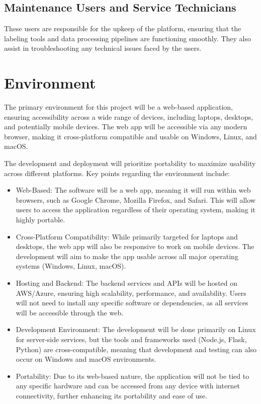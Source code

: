 \documentclass{article}
\begin{document}
\subsection{Maintenance Users and Service Technicians}
These users are responsible for the upkeep of the platform, ensuring that the labeling tools and data processing pipelines are functioning smoothly. They also assist in troubleshooting any technical issues faced by the users.

\newpage


\section{Environment}

The primary environment for this project will be a web-based application, ensuring accessibility across a wide range of devices, including laptops, desktops, and potentially mobile devices. The web app will be accessible via any modern browser, making it cross-platform compatible and usable on Windows, Linux, and macOS.

The development and deployment will prioritize portability to maximize usability across different platforms. Key points regarding the environment include:

\begin{itemize}
    \item Web-Based: The software will be a web app, meaning it will run within web browsers, such as Google Chrome, Mozilla Firefox, and Safari. This will allow users to access the application regardless of their operating system, making it highly portable.

    \item Cross-Platform Compatibility: While primarily targeted for laptops and desktops, the web app will also be responsive to work on mobile devices. The development will aim to make the app usable across all major operating systems (Windows, Linux, macOS).

    \item Hosting and Backend: The backend services and APIs will be hosted on AWS/Azure, ensuring high scalability, performance, and availability. Users will not need to install any specific software or dependencies, as all services will be accessible through the web.

    \item Development Environment: The development will be done primarily on Linux for server-side services, but the tools and frameworks used (Node.js, Flask, Python) are cross-compatible, meaning that development and testing can also occur on Windows and macOS environments.

    \item Portability: Due to its web-based nature, the application will not be tied to any specific hardware and can be accessed from any device with internet connectivity, further enhancing its portability and ease of use.
\end{itemize}
\end{document}
